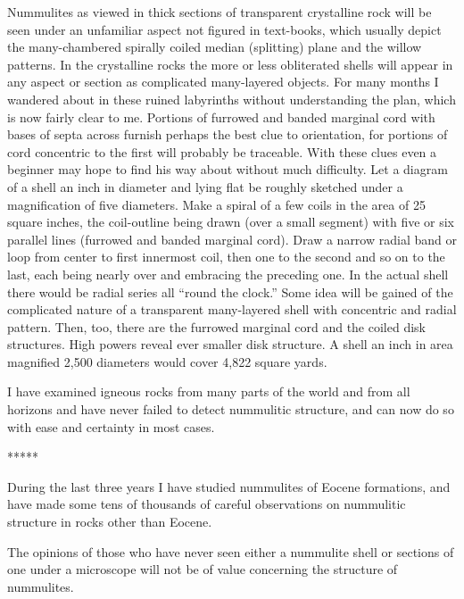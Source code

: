 \documentclass[a4paper, 12pt, oneside]{article}
\begin{document}
Nummulites as viewed in thick sections of transparent crystalline rock will be seen under an unfamiliar aspect not figured in text-books, which usually depict the many-chambered spirally coiled median (splitting) plane and the willow patterns. In the crystalline rocks the more or less obliterated shells will appear in any aspect or section as complicated many-layered objects. For many months I wandered about in these ruined labyrinths without understanding the plan, which is now fairly clear to me. Portions of furrowed and banded marginal cord with bases of septa across furnish perhaps the best clue to orientation, for portions of cord concentric to the first will probably be traceable. With these clues even a beginner may hope to find his way about without much difficulty. Let a diagram of a shell an inch in diameter and lying flat be roughly sketched under a magnification of five diameters. Make a spiral of a few coils in the area of 25 square inches, the coil-outline being drawn (over a small segment) with five or six parallel lines (furrowed and banded marginal cord). Draw a narrow radial band or loop from center to first innermost coil, then one to the second and so on to the last, each being nearly over and embracing the preceding one. In the actual shell there would be radial series all ``round the clock.'' Some idea will be gained of the complicated nature of a transparent many-layered shell with concentric and radial pattern. Then, too, there are the furrowed marginal cord and the coiled disk structures. High powers reveal ever smaller disk structure. A shell an inch in area magnified 2,500 diameters would cover 4,822 square yards.

I have examined igneous rocks from many parts of the world and from all horizons and have never failed to detect nummulitic structure, and can now do so with ease and certainty in most cases.

\centerline{*\hspace{15mm}*\hspace{15mm}*\hspace{15mm}*\hspace{15mm}*}
\bigskip

During the last three years I have studied nummulites of Eocene formations, and have made some tens of thousands of careful observations on nummulitic structure in rocks other than Eocene.

The opinions of those who have never seen either a nummulite shell or sections of one under a microscope will not be of value concerning the structure of nummulites.
\end{document}

